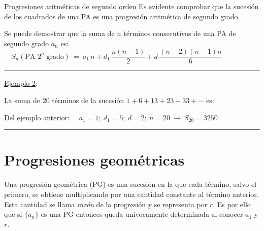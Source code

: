 \begin{myalertblock}{Progresiones aritméticas de segundo orden}
\vspace{2mm} Es evidente comprobar que la sucesión de los cuadrados de una PA es una progresión aritmética de segundo grado.

\vspace{4mm} Se puede demostrar que la suma de $n$ términos consecutivos de una PA de segundo grado $a_n$ es:
$\quad S_n(\text{PA } 2^o \text{ grado}) \ = \ a_1\, n + d_1\, \dfrac{n(n-1)}{2}+d\, \dfrac{(n-2)(n-1)n}{6}$

\vspace{5mm}

\rule{250pt}{0.1pt}

\vspace{2mm} \underline{Ejemplo 2}: 

\vspace{2mm} La suma de $20$ términos de la sucesión $1+6+13+23+33+\cdots$ es:

\vspace{2mm} Del ejemplo anterior: $\quad a_1=1;\ d_1=5;\ d=2;\ n=20 \ \to \ S_{20}=3250$

\begin{flushright} \rule{250pt}{0.1pt} \end{flushright}


\end{myalertblock}


\vspace{1cm}
\section{Progresiones geométricas}
\vspace{0.5cm}


\begin{definition}

Una progresión geométrica (PG) es una sucesión en la que cada término, salvo el primero, se obtiene multiplicando por una cantidad constante al término anterior. Esta cantidad se llama \emph{razón} de la progresión y se representa por $r$. Es por ello que si $\{a_n\}$ es una PG entonces queda unívocamente determinada al conocer $a_1$ y $r$.
	
\end{definition}

